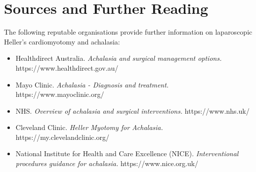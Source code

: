 \section*{Sources and Further Reading}
The following reputable organisations provide further information on laparoscopic Heller's cardiomyotomy and achalasia:
\begin{itemize}
    \item Healthdirect Australia. \textit{Achalasia and surgical management options.} https://www.healthdirect.gov.au/
    \item Mayo Clinic. \textit{Achalasia - Diagnosis and treatment.} https://www.mayoclinic.org/
    \item NHS. \textit{Overview of achalasia and surgical interventions.} https://www.nhs.uk/
    \item Cleveland Clinic. \textit{Heller Myotomy for Achalasia.} https://my.clevelandclinic.org/
    \item National Institute for Health and Care Excellence (NICE). \textit{Interventional procedures guidance for achalasia.} https://www.nice.org.uk/
\end{itemize}
